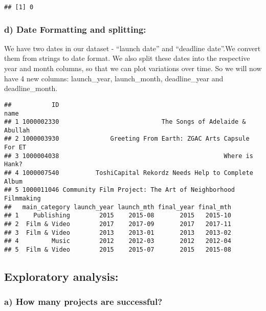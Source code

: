 \documentclass[]{article}
\newenvironment{Shaded}{\begin{snugshade}}{\end{snugshade}}
\newcommand{\KeywordTok}[1]{\textcolor[rgb]{0.13,0.29,0.53}{\textbf{#1}}}
\newcommand{\DecValTok}[1]{\textcolor[rgb]{0.00,0.00,0.81}{#1}}
\newcommand{\OperatorTok}[1]{\textcolor[rgb]{0.81,0.36,0.00}{\textbf{#1}}}
\newcommand{\NormalTok}[1]{#1}
\begin{document}
\begin{verbatim}
## [1] 0
\end{verbatim}

\subsubsection{\texorpdfstring{d) Date Formatting and
splitting:}{d) Date Formatting and splitting: }}\label{d-date-formatting-and-splitting}

We have two dates in our dataset - ``launch date'' and ``deadline
date''.We convert them from strings to date format. We also split these
dates into the respective year and month columns, so that we can plot
variations over time. So we will now have 4 new columns: launch\_year,
launch\_month, deadline\_year and deadline\_month.

\begin{verbatim}
##           ID                                                       name
## 1 1000002330                            The Songs of Adelaide & Abullah
## 2 1000003930              Greeting From Earth: ZGAC Arts Capsule For ET
## 3 1000004038                                             Where is Hank?
## 4 1000007540          ToshiCapital Rekordz Needs Help to Complete Album
## 5 1000011046 Community Film Project: The Art of Neighborhood Filmmaking
##   main_category launch_year launch_mth final_year final_mth
## 1    Publishing        2015    2015-08       2015   2015-10
## 2  Film & Video        2017    2017-09       2017   2017-11
## 3  Film & Video        2013    2013-01       2013   2013-02
## 4         Music        2012    2012-03       2012   2012-04
## 5  Film & Video        2015    2015-07       2015   2015-08
\end{verbatim}

\subsection{\texorpdfstring{{Exploratory
analysis:}}{Exploratory analysis:}}\label{exploratory-analysis}

\subsubsection{a) How many projects are
successful?}\label{a-how-many-projects-are-successful}

\begin{Shaded}
\end{Shaded}
\end{document}
